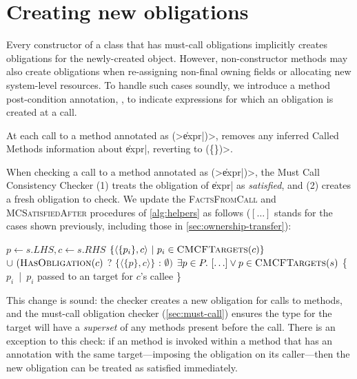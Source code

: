 \section{Creating new obligations}
\label{sec:reset-must-call}



Every constructor of a class that has must-call obligations
implicitly creates obligations for the newly-created object.
However, non-constructor methods may also create obligations
when re-assigning non-final owning fields or allocating
new system-level resources.
To handle such cases soundly, we introduce a method post-condition annotation,
\CreatesMustCallFor,
to indicate expressions for which an obligation is created at a call.

At each call to a method annotated as \CreatesMustCallFor\<(>\|expr|\<)>, \tool removes any
inferred Called Methods information about \|expr|, reverting to
\CalledMethods\<(\{\})>.

When checking a call to a method annotated as
\CreatesMustCallFor\<(>\|expr|\<)>, the Must Call Consistency Checker
(1) treats the \MustCall
obligation of \|expr| as \emph{satisfied},
and (2) creates a fresh obligation to check.
%
We update the \textsc{FactsFromCall} and \textsc{MCSatisfiedAfter} procedures of
\cref{alg:helpers} as follows ($[\ldots]$ stands for the cases shown previously,
including those in \cref{sec:ownership-transfer}):
\begin{algorithmic}
  \State $p \gets s.LHS, c \gets s.RHS$
  \State \Return $\{ \langle \{ p_i \}, c \rangle\ |\ p_i \in \textsc{CMCFTargets}(c) \}$ \newline
  \hspace*{5em} $\cup\ (\textsc{HasObligation}(c)$ ? $\{ \langle \{ p \}, c \rangle \}$ : $\emptyset)$
  \EndProcedure
  \State \Return $\exists p \in P .\ [\ldots] \vee p \in \textsc{CMCFTargets}(s)$
  \EndProcedure
  \State \Return \{ $p_i$\ |\ $p_i$ passed to an \CreatesMustCallFor target for $c$'s callee \}
  \EndProcedure
\end{algorithmic}
\noindent
This change is sound: the checker creates a new obligation for calls to
\CreatesMustCallFor methods, and the must-call obligation checker (\cref{sec:must-call}) ensures the
\MustCall type for the target will have a \emph{superset} of any methods present
before the call.
There is an exception to this check: if an \CreatesMustCallFor
method is invoked within a method that has an \CreatesMustCallFor annotation
with the same target---imposing the obligation on its caller---then
the new obligation can be treated as satisfied immediately.

